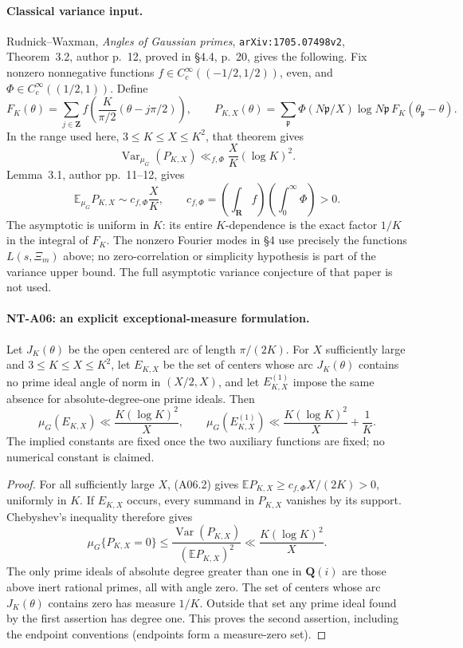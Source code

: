 \paragraph{Classical variance input.}
Rudnick--Waxman, \emph{Angles of Gaussian primes},
\texttt{arXiv:1705.07498v2}, Theorem~3.2, author p.~12,
proved in \S4.4, p.~20, gives the following. Fix nonzero nonnegative
functions \(f\in C_c^\infty((-1/2,1/2))\), even, and
\(\Phi\in C_c^\infty((1/2,1))\). Define
\[
 F_K(\theta)=\sum_{j\in\mathbf Z}
 f\left(\frac{K}{\pi/2}(\theta-j\pi/2)\right),\qquad
 P_{K,X}(\theta)=
 \sum_{\mathfrak p}\Phi(N\mathfrak p/X)\log N\mathfrak p\,
                         F_K(\theta_{\mathfrak p}-\theta).
\]
In the range used here, \(3\le K\le X\le K^2\), that theorem gives
\[
 \operatorname{Var}_{\mu_G}(P_{K,X})
       \ll_{f,\Phi}\frac{X}{K}(\log K)^2.             \tag{A06.1}
\]
Lemma~3.1, author pp.~11--12, gives
\[
 \mathbb E_{\mu_G}P_{K,X}
       \sim c_{f,\Phi}\frac XK,\qquad
 c_{f,\Phi}=\left(\int_{\mathbf R}f\right)
            \left(\int_0^\infty\Phi\right)>0.        \tag{A06.2}
\]
The asymptotic is uniform in \(K\): its entire \(K\)-dependence is
the exact factor \(1/K\) in the integral of \(F_K\).
The nonzero Fourier modes in \S4 use precisely the functions
\(L(s,\Xi_m)\) above; no zero-correlation or simplicity hypothesis
is part of the variance upper bound. The full asymptotic variance
conjecture of that paper is not used.

\paragraph{NT-A06: an explicit exceptional-measure formulation.}
Let \(J_K(\theta)\) be the open centered arc of length \(\pi/(2K)\).
For \(X\) sufficiently large and \(3\le K\le X\le K^2\),
let \(E_{K,X}\) be the set of centers whose arc \(J_K(\theta)\)
contains no prime ideal angle of norm in \((X/2,X)\), and let
\(E^{(1)}_{K,X}\) impose the same absence for absolute-degree-one
prime ideals. Then
\[
 \mu_G(E_{K,X})\ll\frac{K(\log K)^2}{X},\qquad
 \mu_G(E^{(1)}_{K,X})\ll\frac{K(\log K)^2}{X}+\frac1K .
                                                               \tag{A06.3}
\]
The implied constants are fixed once the two auxiliary functions
are fixed; no numerical constant is claimed.

\begin{proof}
For all sufficiently large \(X\), (A06.2) gives
\(\mathbb E P_{K,X}\ge c_{f,\Phi}X/(2K)>0\), uniformly in \(K\).
If \(E_{K,X}\) occurs, every summand in \(P_{K,X}\)
vanishes by its support. Chebyshev's inequality therefore gives
\[
 \mu_G\{P_{K,X}=0\}
 \le \frac{\operatorname{Var}(P_{K,X})}
           {(\mathbb E P_{K,X})^2}
 \ll \frac{K(\log K)^2}{X}.
 \]
The only prime ideals of absolute degree greater than one in
\(\mathbf Q(i)\) are those above inert rational primes, all with
angle zero. The set of centers whose arc \(J_K(\theta)\) contains
zero has measure \(1/K\). Outside that set any prime ideal found
by the first assertion has degree one. This proves the second
assertion, including the endpoint conventions (endpoints form a
measure-zero set).
\end{proof}

